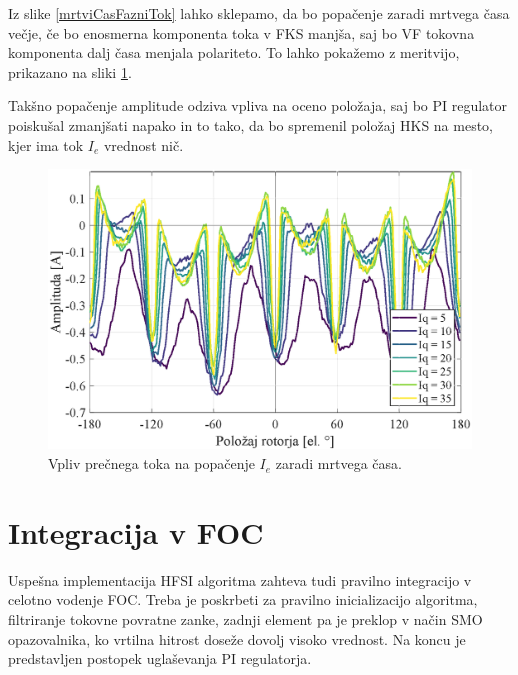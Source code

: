 \documentclass[a4paper,twoside,openright,12pt,slovene]{book}
\begin{document}
Iz slike \ref{mrtviCasFazniTok} lahko sklepamo, da bo popačenje zaradi mrtvega časa večje, če bo enosmerna komponenta toka v FKS manjša, saj bo VF tokovna komponenta dalj časa menjala polariteto. To
lahko pokažemo z meritvijo, prikazano na sliki \ref{tokovniOdzivIs_HKSslediRKS_IdiffAmp_DT}.

\newpage
Takšno popačenje amplitude odziva vpliva na oceno položaja, saj bo PI regulator poiskušal zmanjšati napako in to tako, da bo spremenil položaj HKS na mesto, kjer ima tok $I_e$ vrednost nič.

\begin{figure}[!htbp]
    \centering
    \includegraphics[width=0.99\columnwidth]{Slike/tokovniOdzivIs_HKSslediRKS_IdiffAmp_DT.eps}
    \caption{\label{tokovniOdzivIs_HKSslediRKS_IdiffAmp_DT} Vpliv prečnega toka na popačenje $I_e$ zaradi mrtvega časa. }
\end{figure}

\chapter{Integracija v FOC} \label{integracija}

Uspešna implementacija HFSI algoritma zahteva tudi pravilno integracijo v celotno vodenje FOC. Treba je poskrbeti za pravilno inicializacijo algoritma, filtriranje tokovne povratne
zanke, zadnji element pa je preklop v način SMO opazovalnika, ko vrtilna hitrost doseže dovolj visoko vrednost. Na koncu je predstavljen postopek uglaševanja PI regulatorja.
\end{document}
